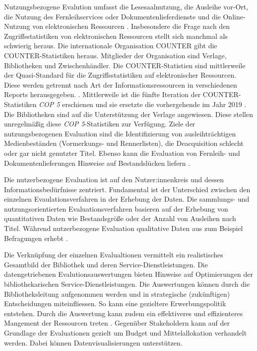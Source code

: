 Nutzungsbezogene Evalution umfasst die Lesesaalnutzung, die Ausleihe vor-Ort, die Nutzung des Fernleihservices oder Dokumentenlieferdienste und die Online-Nutzung von elektronischen Ressourcen
\cite[vgl.][254 ff.]{johannsen_jochen_bestands-_2015}.
Insbesondere die Frage nach den Zugriffsstatistiken von elektronischen Ressourcen stellt sich manchmal als schwierig heraus.
Die internationale Organisation \acrfull{COUNTER} gibt die COUNTER-Statistiken heraus. Mitglieder der Organisation sind Verlage, Bibliotheken
und Zwischenhändler. Die COUNTER-Statistien sind mittlerweile der Quasi-Standard für die Zugriffsstatistiken 
auf elektronischer Ressourcen.  Diese werden getrennt nach Art der Informationsressourcen in verschiedenen Reports herausgegeben. \cite[vgl.][260 ff.]{johannsen_jochen_bestands-_2015}.
Mittlerweile ist die fünfte Iteration der COUNTER-Statistiken \textit{\acrshort{COP 5}} erschienen und 
sie ersetzte die vorhergehende im Jahr 2019 \cite[vgl.][]{counter_abstract_2020}. 
Die Bibliotheken sind auf die Unterstützung der Verlage angewiesen. Diese stellen unregelmäßig diese \textit{\acrshort{COP 5}}-Statistiken zur Verfügung.
Ziele der nutzungsbezogenen Evaluation sind die Identifizierung von ausleihträchtigen Medienbeständen (Vormerkungs- und Rennerlisten), 
die Deacquisition schlecht oder gar nicht genutzter Titel. Ebenso kann die Evaluation von Fernleih- und Dokumentenlieferungen Hinweise auf Bestandslücken liefern
\cite[vgl.][255 ff.]{johannsen_jochen_bestands-_2015}.

Die nutzerbezogene Evaluation ist auf den Nutzer:innenkreis und dessen Informationsbedürfnisse zentriert.
Fundamental ist der Unterschied zwischen den einzelnen Evaulationsverfahren in der Erhebung der Daten. 
Die sammlungs- und nutzungsorientierten Evaluationsverfahren basieren auf der Erhebung von quantitativen Daten wie Bestandsgröße oder der Anzahl von Ausleihen nach Titel. 
Während nutzerbezogene Evaluation qualitative Daten aus zum Beispiel Befragungen erhebt \cite[vgl.][461 ff.]{blake_data_2004}.

Die Verknüpfung der einzelnen Evalualtionen vermittelt ein realistisches Gesamtbild der Bibliothek und deren Service-Dienstleistungen. Die datengetriebenen Evalutionsauswertungen bieten Hinweise auf Optimierungen der bibliothekarischen Service-Dienstleistungen. Die Auswertungen können durch die Bibliotheksleitung aufgenommen werden und in strategische (zukünftigen) Entscheidungen miteinfliessen. So kann eine gezieltere Erwerbungspolitik entstehen. Durch die Auswertung kann zudem ein effektiveres und effizienteres Mangement der Ressourcen treten \cite[vgl.][297]{johnson_peggy_fundamentals_2014}. Gegenüber Stakeholdern kann auf der Grundlage der Evaluationen gezielt um Budget und Mittelallokation verhandelt werden. Dabei können Datenvisualisierungen unterstützen.



